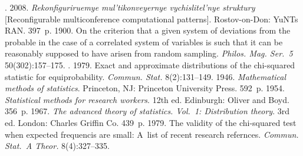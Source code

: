     







  \begin{multicols}{2}

\renewcommand{\bibname}{\protect\rmfamily References}

{\small\frenchspacing
 {%
 \begin{thebibliography}{9}
    . 2008. \textit{Rekonfiguriruemye mul'tikonveyernye 
vychislitel'nye struktury} [Reconfigurable multiconference computational 
patterns]. Rostov-on-Don: YuNTs RAN. 397~p.
     1900. On the criterion that a given system of deviations 
from the probable in the case of a correlated system of variables is such that it 
can be reasonably supposed to have arisen from random sampling. 
\textit{Philos. Mag. Ser.~5} 50(302):157--175.
    . 
1979. Exact and approximate distributions of the chi-squared statistic for 
equiprobability. \textit{Commun. Stat.} 8(2):131--149.
     1946. \textit{Mathematical methods of statistics}. 
Princeton, NJ: Princeton University Press. 592~p.
     1954. \textit{Statistical methods for research 
workers}. 12th ed. Edinburgh: Oliver and Boyd. 356~p.
     1967. \textit{The advanced theory 
of statistics. Vol.~1: Distribution theory}. 3rd ed. London: Charles Griffin 
Co. 439~p.
 1979. The validity of the chi-squared test when expected
frequencis are small: A~list of recent research refernces.
\textit{Commun. Stat.~A Theor.} 8(4):327--335.
\end{thebibliography}

 }
 }

\end{multicols}

